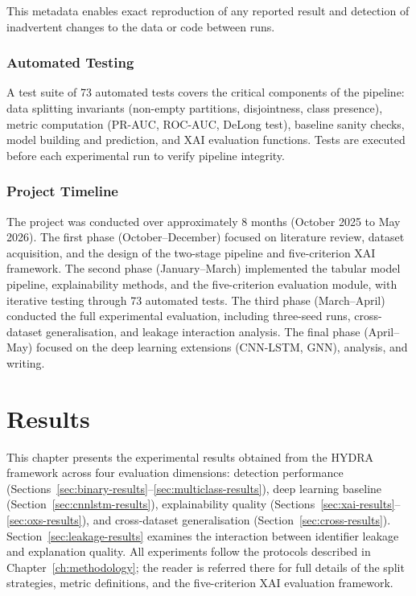 \documentclass[12pt,a4paper]{report}
\begin{document}
This metadata enables exact reproduction of any reported result and detection of inadvertent changes to the data or code between runs.

\subsection{Automated Testing}
\label{sec:testing}

A test suite of 73 automated tests covers the critical components of the pipeline: data splitting invariants (non-empty partitions, disjointness, class presence), metric computation (PR-AUC, ROC-AUC, DeLong test), baseline sanity checks, model building and prediction, and XAI evaluation functions. Tests are executed before each experimental run to verify pipeline integrity.

\subsection{Project Timeline}
\label{sec:timeline}

The project was conducted over approximately 8 months (October 2025 to May 2026). The first phase (October--December) focused on literature review, dataset acquisition, and the design of the two-stage pipeline and five-criterion XAI framework. The second phase (January--March) implemented the tabular model pipeline, explainability methods, and the five-criterion evaluation module, with iterative testing through 73 automated tests. The third phase (March--April) conducted the full experimental evaluation, including three-seed runs, cross-dataset generalisation, and leakage interaction analysis. The final phase (April--May) focused on the deep learning extensions (CNN-LSTM, GNN), analysis, and writing.

\chapter{Results}
\label{ch:results}

This chapter presents the experimental results obtained from the HYDRA framework across four evaluation dimensions: detection performance (Sections~\ref{sec:binary-results}--\ref{sec:multiclass-results}), deep learning baseline (Section~\ref{sec:cnnlstm-results}), explainability quality (Sections~\ref{sec:xai-results}--\ref{sec:oxs-results}), and cross-dataset generalisation (Section~\ref{sec:cross-results}). Section~\ref{sec:leakage-results} examines the interaction between identifier leakage and explanation quality. All experiments follow the protocols described in Chapter~\ref{ch:methodology}; the reader is referred there for full details of the split strategies, metric definitions, and the five-criterion XAI evaluation framework.
\end{document}
